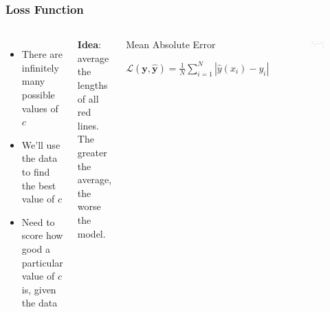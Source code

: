 \documentclass{beamer}
\begin{document}
\begin{frame}
\frametitle{Loss Function}

\begin{columns}

\begin{itemize}
\item There are infinitely many possible values of $c$
\item We'll use the data to find the best value of $c$ 
\item Need to score how good a particular value of $c$ is, given the data

\end{itemize}

\textbf{Idea}: average the lengths of all red lines. The greater the average, the worse the model. 

\begin{block}{Mean Absolute Error} 
\centering

$\mathcal{L}(\mathbf{y},\hat{\mathbf{y}})=\frac{1}{N}\sum_{i=1}^{N}\left|\hat{y}(x_{i})-y_{i}\right|$
\end{block}



\begin{figure}
\includegraphics[width=\textwidth]{../figures/loss_demo.png}
\end{figure}

\end{columns}

\end{frame}
\end{document}
